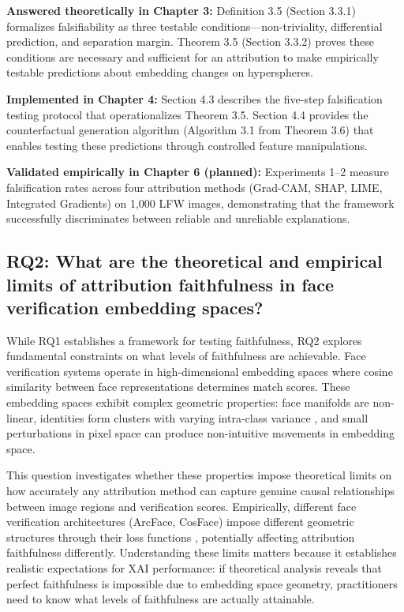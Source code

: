 \vspace{0.3cm}
\noindent\textbf{Answered theoretically in Chapter 3:} Definition 3.5 (Section 3.3.1) formalizes falsifiability as three testable conditions---non-triviality, differential prediction, and separation margin. Theorem 3.5 (Section 3.3.2) proves these conditions are necessary and sufficient for an attribution to make empirically testable predictions about embedding changes on hyperspheres.

\vspace{0.3cm}
\noindent\textbf{Implemented in Chapter 4:} Section 4.3 describes the five-step falsification testing protocol that operationalizes Theorem 3.5. Section 4.4 provides the counterfactual generation algorithm (Algorithm 3.1 from Theorem 3.6) that enables testing these predictions through controlled feature manipulations.

\vspace{0.3cm}
\noindent\textbf{Validated empirically in Chapter 6 (planned):} Experiments 1--2 measure falsification rates across four attribution methods (Grad-CAM, SHAP, LIME, Integrated Gradients) on 1,000 LFW images, demonstrating that the framework successfully discriminates between reliable and unreliable explanations.

\subsection*{RQ2: What are the theoretical and empirical limits of attribution faithfulness in face verification embedding spaces?}

While RQ1 establishes a framework for testing faithfulness, RQ2 explores fundamental constraints on what levels of faithfulness are achievable. Face verification systems operate in high-dimensional embedding spaces \cite{wang2021survey,masi2018survey} where cosine similarity between face representations determines match scores. These embedding spaces exhibit complex geometric properties: face manifolds are non-linear, identities form clusters with varying intra-class variance \cite{schroff2015facenet,parkhi2015vggface}, and small perturbations in pixel space can produce non-intuitive movements in embedding space.

This question investigates whether these properties impose theoretical limits on how accurately any attribution method can capture genuine causal relationships between image regions and verification scores. Empirically, different face verification architectures (ArcFace, CosFace) impose different geometric structures through their loss functions \cite{deng2019arcface,wang2018cosface,liu2017sphereface}, potentially affecting attribution faithfulness differently. Understanding these limits matters because it establishes realistic expectations for XAI performance: if theoretical analysis reveals that perfect faithfulness is impossible due to embedding space geometry, practitioners need to know what levels of faithfulness are actually attainable.


